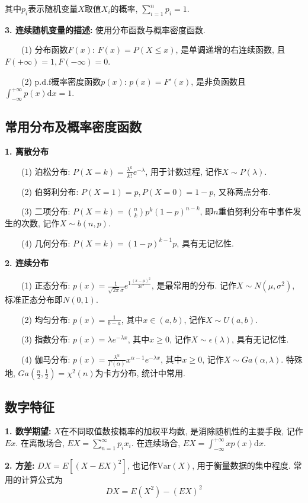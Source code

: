 其中$p_i$表示随机变量$X$取值$X_i$的概率, $\sum\limits_{i=1}^n p_i=1$.

\textbf{3. 连续随机变量的描述: }使用分布函数与概率密度函数.

~~~~(1) 分布函数$F(x)$: $F(x)=P(X \leq x)$, 是单调递增的右连续函数, 且$F(+\infty)=1, F(-\infty)=0$.

~~~~(2) p.d.f概率密度函数$p(x)$: $p(x)=F'(x)$, 是非负函数且$\int_{-\infty}^{+\infty} p(x)\mathrm{d}x=1$.

\subsection{常用分布及概率密度函数}

\textbf{1. 离散分布}

~~~~(1) 泊松分布: $P(X=k)=\frac{\lambda^k}{k!}e^{-\lambda}$, 用于计数过程, 记作$X\sim P(\lambda)$.

~~~~(2) 伯努利分布: $P(X=1)=p, P(X=0)=1-p$, 又称两点分布.

~~~~(3) 二项分布: $P(X=k)=\binom{n}{k}p^k(1-p)^{n-k}$, 即$n$重伯努利分布中事件发生的次数, 记作$X\sim b(n,p)$.

~~~~(4) 几何分布: $P(X=k)=(1-p)^{k-1}p$, 具有无记忆性.

\textbf{2. 连续分布}

~~~~(1) 正态分布: $p(x)=\frac{1}{\sqrt{2\pi}\sigma}e^{1\frac{(x-\mu)^2}{2\sigma^2}}$, 是最常用的分布. 记作$X\sim N(\mu, \sigma^2)$, 标准正态分布即$N(0,1)$.

~~~~(2) 均匀分布: $p(x)=\frac{1}{b-a}$, 其中$x \in (a,b)$, 记作$X \sim U(a,b)$.

~~~~(3) 指数分布: $p(x)=\lambda e^{-\lambda x}$, 其中$x \geq 0$, 记作$X\sim \epsilon(\lambda)$, 具有无记忆性.

~~~~(4) 伽马分布: $p(x)=\frac{\lambda^\alpha}{\Gamma(\alpha)}x^{\alpha-1}e^{-\lambda x}$, 其中$x\geq 0$, 记作$X\sim Ga(\alpha,\lambda)$. 特殊地, $Ga(\frac{n}{2},\frac{1}{2})=\chi^2(n)$为卡方分布, 统计中常用.

\subsection{数字特征}

\textbf{1. 数学期望: }$X$在不同取值数按概率的加权平均数, 是消除随机性的主要手段, 记作$Ex$.
在离散场合, $EX=\sum\limits_{n=1}^\infty p_ix_i$. 在连续场合, $EX=\int_{-\infty}^{+\infty}xp(x)\mathrm{d}x$.

\textbf{2. 方差: }$DX=E[(X-EX)^2]$, 也记作$\text{Var}(X)$, 用于衡量数据的集中程度. 常用的计算公式为
\begin{equation*}
    DX=E(X^2)-(EX)^2
\end{equation*}

